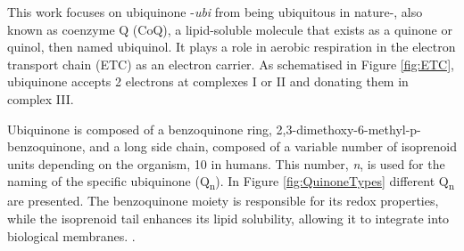 This work focuses on ubiquinone -\textit{ubi} from being ubiquitous in nature-, also known as coenzyme Q (CoQ), a lipid-soluble molecule that exists as a quinone or quinol, then named ubiquinol. It plays a role in aerobic respiration in the electron transport chain (ETC) as an electron carrier. As schematised in Figure \ref{fig:ETC}, ubiquinone accepts 2 electrons at complexes I or II and donating them in complex III\cite{ernster1995biochemical}.

Ubiquinone is composed of a benzoquinone ring, 2,3-dimethoxy-6-methyl-p-benzoquinone, and a long side chain, composed of a variable number of isoprenoid units depending on the organism, 10 in humans. This number, \textit{n}, is used for the naming of the specific ubiquinone (Q\textsubscript{n}). In Figure \ref{fig:QuinoneTypes} different Q\textsubscript{n} are presented. The benzoquinone moiety is responsible for its redox properties, while the isoprenoid tail enhances its lipid solubility, allowing it to integrate into biological membranes. \cite{ernster1995biochemical}.


